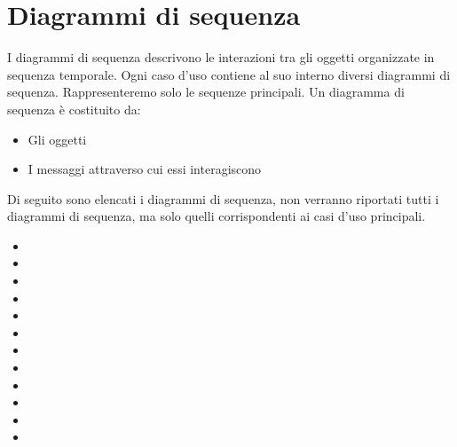 \section{Diagrammi di sequenza}  \label{cha:sequenza}
I diagrammi di sequenza descrivono le interazioni tra gli oggetti organizzate in sequenza temporale. Ogni caso d’uso contiene al suo interno diversi diagrammi di sequenza. Rappresenteremo solo le sequenze principali.
Un diagramma di sequenza è costituito da:
\begin{itemize}
	\item Gli oggetti
	\item I messaggi attraverso cui essi interagiscono
\end{itemize}
Di seguito sono elencati i diagrammi di sequenza, non verranno riportati tutti i diagrammi di sequenza, ma solo quelli corrispondenti ai casi d'uso principali.
\begin{itemize}
	\item {}
	\item {}
	\item {}
	\item {}
	\item {}
	\item {}
	\item {}
	\item {}
	\item {}
	\item {}
	\item {}
	\item {}
\end{itemize}

